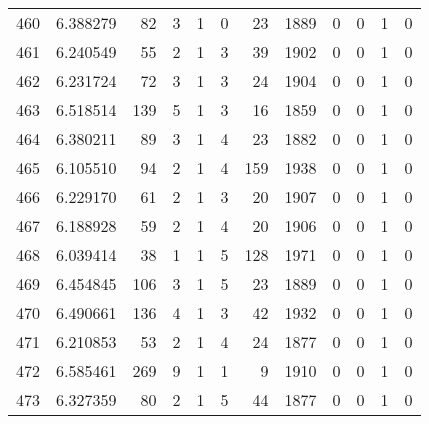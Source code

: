 \begin{tabular}{lrrrrrrrrrrr}
460 &  6.388279 &   82 &      3 &        1 &      0 &              23 &  1889 &               0 &               0 &               1 &               0 \\
461 &  6.240549 &   55 &      2 &        1 &      3 &              39 &  1902 &               0 &               0 &               1 &               0 \\
462 &  6.231724 &   72 &      3 &        1 &      3 &              24 &  1904 &               0 &               0 &               1 &               0 \\
463 &  6.518514 &  139 &      5 &        1 &      3 &              16 &  1859 &               0 &               0 &               1 &               0 \\
464 &  6.380211 &   89 &      3 &        1 &      4 &              23 &  1882 &               0 &               0 &               1 &               0 \\
465 &  6.105510 &   94 &      2 &        1 &      4 &             159 &  1938 &               0 &               0 &               1 &               0 \\
466 &  6.229170 &   61 &      2 &        1 &      3 &              20 &  1907 &               0 &               0 &               1 &               0 \\
467 &  6.188928 &   59 &      2 &        1 &      4 &              20 &  1906 &               0 &               0 &               1 &               0 \\
468 &  6.039414 &   38 &      1 &        1 &      5 &             128 &  1971 &               0 &               0 &               1 &               0 \\
469 &  6.454845 &  106 &      3 &        1 &      5 &              23 &  1889 &               0 &               0 &               1 &               0 \\
470 &  6.490661 &  136 &      4 &        1 &      3 &              42 &  1932 &               0 &               0 &               1 &               0 \\
471 &  6.210853 &   53 &      2 &        1 &      4 &              24 &  1877 &               0 &               0 &               1 &               0 \\
472 &  6.585461 &  269 &      9 &        1 &      1 &               9 &  1910 &               0 &               0 &               1 &               0 \\
473 &  6.327359 &   80 &      2 &        1 &      5 &              44 &  1877 &               0 &               0 &               1 &               0 \\

\end{tabular}
